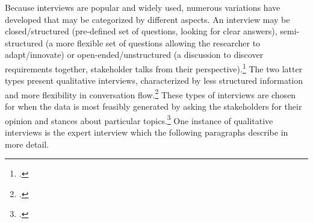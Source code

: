 Because interviews are popular and widely used, numerous variations have developed that may be categorized by different aspects. An interview may be closed/structured (pre-defined set of questions, looking for clear answers), semi-structured (a more flexible set of questions allowing the researcher to adapt/innovate) or open-ended/unstructured (a discussion to discover requirements together, stakeholder talks from their perspective).\footcites[Cf.][p.2]{TiwariMethodologySelectionRequirement2017}[cf.][pp.39]{EdwardsWhatqualitativeinterviewing2013} The two latter types present qualitative interviews, characterized by less structured information and more flexibility in conversation flow.\footcite[Cf.][p.13]{EdwardsWhatqualitativeinterviewing2013} These types of interviews are chosen for when the data is most feasibly generated by asking the stakeholders for their opinion and stances about particular topics.\footcite[Cf.][p.76]{MasonQualitativeresearching2002} One instance of qualitative interviews is the expert interview which the following paragraphs describe in more detail.




